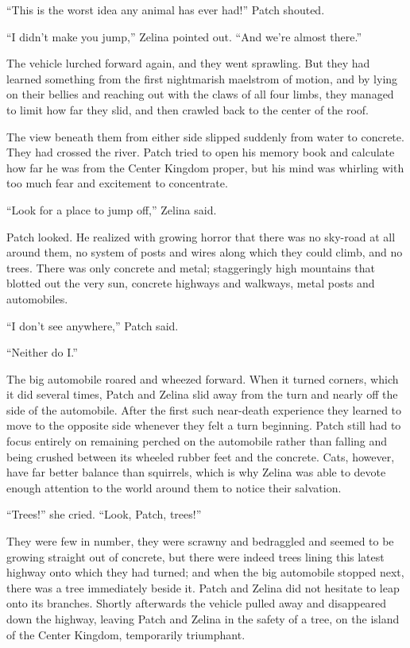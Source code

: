 \documentclass[ebook,oneside,openany,12pt]{memoir}
\begin{document}
“This is the worst idea any animal has ever had!” Patch shouted.

“I didn’t make you jump,” Zelina pointed out. “And we’re almost
there.”

The vehicle lurched forward again, and they went sprawling. But they
had learned something from the first nightmarish maelstrom of motion,
and by lying on their bellies and reaching out with the claws of all
four limbs, they managed to limit how far they slid, and then crawled
back to the center of the roof.

The view beneath them from either side slipped suddenly from water to
concrete. They had crossed the river. Patch tried to open his memory
book and calculate how far he was from the Center Kingdom proper, but
his mind was whirling with too much fear and excitement to
concentrate.

“Look for a place to jump off,” Zelina said.

Patch looked. He realized with growing horror that there was no
sky-road at all around them, no system of posts and wires along which
they could climb, and no trees. There was only concrete and metal;
staggeringly high mountains that blotted out the very sun, concrete
highways and walkways, metal posts and automobiles.

“I don’t see anywhere,” Patch said.

“Neither do I.”

The big automobile roared and wheezed forward. When it turned corners,
which it did several times, Patch and Zelina slid away from the turn
and nearly off the side of the automobile. After the first such
near-death experience they learned to move to the opposite side
whenever they felt a turn beginning. Patch still had to focus entirely
on remaining perched on the automobile rather than falling and being
crushed between its wheeled rubber feet and the concrete. Cats,
however, have far better balance than squirrels, which is why Zelina
was able to devote enough attention to the world around them to notice
their salvation.

“Trees!” she cried. “Look, Patch, trees!”

They were few in number, they were scrawny and bedraggled and seemed
to be growing straight out of concrete, but there were indeed trees
lining this latest highway onto which they had turned; and when the
big automobile stopped next, there was a tree immediately beside
it. Patch and Zelina did not hesitate to leap onto its
branches. Shortly afterwards the vehicle pulled away and disappeared
down the highway, leaving Patch and Zelina in the safety of a tree, on
the island of the Center Kingdom, temporarily triumphant.
\end{document}
